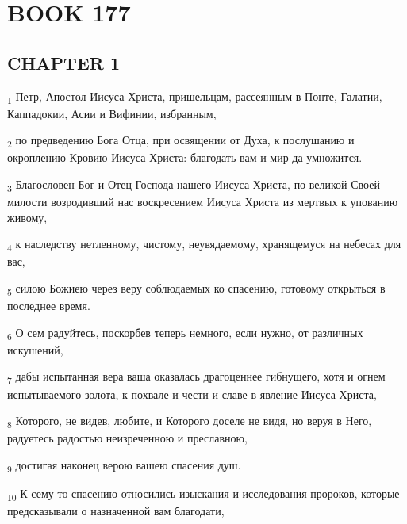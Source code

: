\section{BOOK 177}
\subsection{CHAPTER 1}
\begin{tcolorbox}
\textsubscript{1} Петр, Апостол Иисуса Христа, пришельцам, рассеянным в Понте, Галатии, Каппадокии, Асии и Вифинии, избранным,
\end{tcolorbox}
\begin{tcolorbox}
\textsubscript{2} по предведению Бога Отца, при освящении от Духа, к послушанию и окроплению Кровию Иисуса Христа: благодать вам и мир да умножится.
\end{tcolorbox}
\begin{tcolorbox}
\textsubscript{3} Благословен Бог и Отец Господа нашего Иисуса Христа, по великой Своей милости возродивший нас воскресением Иисуса Христа из мертвых к упованию живому,
\end{tcolorbox}
\begin{tcolorbox}
\textsubscript{4} к наследству нетленному, чистому, неувядаемому, хранящемуся на небесах для вас,
\end{tcolorbox}
\begin{tcolorbox}
\textsubscript{5} силою Божиею через веру соблюдаемых ко спасению, готовому открыться в последнее время.
\end{tcolorbox}
\begin{tcolorbox}
\textsubscript{6} О сем радуйтесь, поскорбев теперь немного, если нужно, от различных искушений,
\end{tcolorbox}
\begin{tcolorbox}
\textsubscript{7} дабы испытанная вера ваша оказалась драгоценнее гибнущего, хотя и огнем испытываемого золота, к похвале и чести и славе в явление Иисуса Христа,
\end{tcolorbox}
\begin{tcolorbox}
\textsubscript{8} Которого, не видев, любите, и Которого доселе не видя, но веруя в Него, радуетесь радостью неизреченною и преславною,
\end{tcolorbox}
\begin{tcolorbox}
\textsubscript{9} достигая наконец верою вашею спасения душ.
\end{tcolorbox}
\begin{tcolorbox}
\textsubscript{10} К сему-то спасению относились изыскания и исследования пророков, которые предсказывали о назначенной вам благодати,
\end{tcolorbox}
